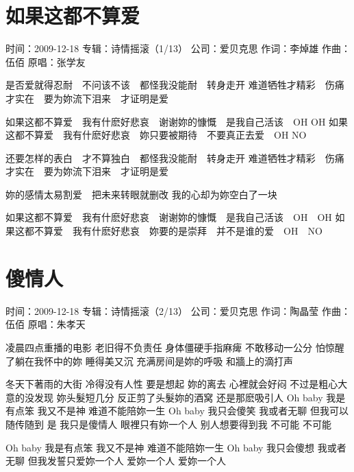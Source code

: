 \documentclass[UTF8,a4paper,oneside,twocolumn,12pt]{ctexbook}
\newcommand{\infopair}[2]{\textbullet #1：#2}
\newcommand{\zc}[1][伍佰]{\infopair{作词}{#1}}
\newcommand{\zq}[1][伍佰]{\infopair{作曲}{#1}}
\newcommand{\zj}[1]{\infopair{专辑}{#1}}
\newcommand{\yc}[1]{\infopair{原唱}{#1}}
\newcommand{\sj}[1]{\infopair{时间}{#1}}
\newcommand{\gs}[1]{\infopair{公司}{#1}}
\newenvironment{info}{\begin{flushleft}\kaishu
	}
	{\end{flushleft}\normalsize\yahei\par}
\newenvironment{lyric}{
	}
{}
\begin{document}
\section{如果这都不算爱}
\begin{info}
	\sj{2009-12-18}
	\zj{诗情摇滚（1/13）}
	\gs{爱贝克思}
	\zc[李焯雄]
	\zq
	\yc{张学友}
\end{info}
\begin{lyric}
	是否爱就得忍耐　不问该不该　都怪我没能耐　转身走开
	难道牺牲才精彩　伤痛才实在　要为妳流下泪来　才证明是爱

	如果这都不算爱　我有什麽好悲哀　谢谢妳的慷慨　是我自己活该　OH OH
	如果这都不算爱　我有什麽好悲哀　妳只要被期待　不要真正去爱　OH NO

	还要怎样的表白　才不算独白　都怪我没能耐　转身走开
	难道牺牲才精彩　伤痛才实在　要为妳流下泪来　才证明是爱

	妳的感情太易割爱　把未来转眼就删改
	我的心却为妳空白了一块

	如果这都不算爱　我有什麽好悲哀　谢谢妳的慷慨　是我自己活该　OH　OH
	如果这都不算爱　我有什麽好悲哀　妳要的是崇拜　并不是谁的爱　OH　NO
\end{lyric}

\section{傻情人}
\begin{info}
	\sj{2009-12-18}
	\zj{诗情摇滚（2/13）}
	\gs{爱贝克思}
	\zc[陶晶莹]
	\zq
	\yc{朱孝天}
\end{info}
\begin{lyric}
	凌晨四点重播的电影 老旧得不负责任
	身体僵硬手指麻痺 不敢移动一公分
	怕惊醒了躺在我怀中的妳 睡得美又沉
	充满房间是妳的呼吸 和牆上的滴打声

	冬天下著雨的大街 冷得没有人性
	要是想起 妳的离去 心裡就会好闷
	不过是粗心大意的没发现 妳头髮短几分
	反正剪了头髮妳的酒窝 还是那麽吸引人
	Oh baby 我是有点笨 我又不是神
	难道不能陪妳一生
	Oh baby 我只会傻笑 我或者无聊
	但我可以随传随到
	是 我只是傻情人 眼裡只有妳一个人
	别人想要得到我 不可能 不可能

	Oh baby 我是有点笨 我又不是神
	难道不能陪妳一生
	Oh baby 我只会傻想 我或者无聊
	但我发誓只爱妳一个人 爱妳一个人 爱妳一个人
\end{lyric}
\end{document}
